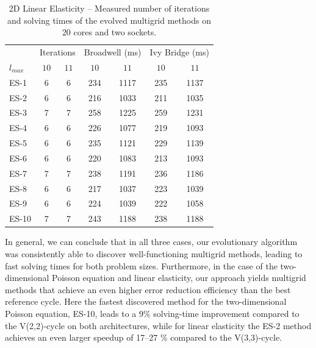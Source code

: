 \begin{table}
	\caption{2D Linear Elasticity -- Measured number of iterations and solving times of the evolved multigrid methods on 20 cores and two sockets.}
	\label{table:linear-elasticity-2D-evolved-methods}
	\centering
	\begin{tabular}{l c c c c c c}
		\toprule
		& \multicolumn{2}{c}{Iterations} & \multicolumn{2}{c}{Broadwell (ms)} & \multicolumn{2}{c}{Ivy Bridge (ms)} \\
		\cmidrule(r){2-3} \cmidrule(r){4-5} \cmidrule(r){6-7}
		$l_{max}$ & $10$& $11$ & $10$ & $11$ & $10$ & $11$\\
		\midrule
		ES-1 & 6 & 6 & 234 & 1117 & 235 & 1137 \\
		\midrule
		ES-2 & 6 & 6 & 216 & 1033 & 211 & 1035 \\
		\midrule
		ES-3 & 7 & 7 & 258 & 1225 & 259 & 1231 \\
		\midrule
		ES-4 & 6 & 6 & 226 & 1077 & 219 & 1093 \\
		\midrule
		ES-5 & 6 & 6 & 235 & 1121 & 229 & 1139 \\
		\midrule
		ES-6 & 6 & 6 & 220 & 1083 & 213 & 1093 \\
		\midrule
		ES-7 & 7 & 7 & 238 & 1191 & 236 & 1186 \\
		\midrule
		ES-8 & 6 & 6 & 217 & 1037 & 223 & 1039 \\
		\midrule
		ES-9 & 6 & 6 & 224 & 1039 & 222 & 1058 \\
		\midrule
		ES-10 & 7 & 7 & 243 & 1188 & 238 & 1188 \\
		\bottomrule
	\end{tabular}
\end{table}
In general, we can conclude that in all three cases, our evolutionary algorithm was consistently able to discover well-functioning multigrid methods, leading to fast solving times for both problem sizes.
Furthermore, in the case of the two-dimensional Poisson equation and linear elasticity, our approach yields multigrid methods that achieve an even higher error reduction efficiency than the best reference cycle.
Here the fastest discovered method for the two-dimensional Poisson equation, ES-10, leads to a $9 \%$ solving-time improvement compared to the V(2,2)-cycle on both architectures, while for linear elasticity the ES-2 method achieves an even larger speedup of 17--27 \% compared to the V(3,3)-cycle.
